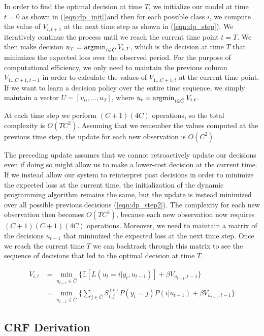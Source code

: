 \documentclass[12pt,solutions]{article}
\newcommand{\argmin}{\operatornamewithlimits{argmin}}
\newcommand{\E}{\mathbb{E}}
\begin{document}
In order to find the optimal decision at time $T$, we initialize our model at time $t=0$ as shown in (\ref{eqn:dp_init})and then for each possible class $i$, we compute the value of $V_{i,t+1}$ at the next time step as shown in (\ref{eqn:dp_step}). We iteratively continue the process until we reach the current time point $t=T$. We then make decision $u_T = \argmin_{i \in \hat{C}} V_{i, T}$, which is the decision at time $T$ that minimizes the expected loss over the observed period. For the purpose of computational efficiency, we only need to maintain the previous column $V_{1\ldots C+1, t-1}$ in order to calculate the values of $V_{1\ldots C+1, t}$ at the current time point. If we want to learn a decision policy over the entire time sequence, we simply maintain a vector $U = [u_0, \ldots, u_T]$, where $u_t =  \argmin_{i \in \hat{C}} V_{i, t}$.

At each time step we perform $(C+1)(4C)$ operations, so the total complexity is $O(TC^2)$. Assuming that we remember the values computed at the previous time step, the update for each new observation is $O(C^2)$.


The preceding update assumes that we cannot retroactively update our decisions even if doing so might allow us to make a lower-cost decision at the current time. If we instead allow our system to reinterpret past decisions in order to minimize the expected loss at the current time, the initialization of the dynamic programming algorithm remains the same, but the update is instead minimized over all possible previous decisions (\ref{eqn:dp_step2}). The complexity for each new observation then becomes $O(TC^3)$, because each new observation now requires $(C+1)(C+1)(4C)$ operations. Moreover, we need to maintain a matrix of the decisions $u_{t-1}$ that minimized the expected loss at the next time step. Once we reach the current time $T$ we can backtrack through this matrix to see the sequence of decisions that led to the optimal decision at time $T$. 

\begin{align}
V_{i,t} &= \min_{u_{t-1} \in \hat{C}} \big\{ \E[L(u_t=i|y_t, u_{t-1})] + \beta V_{u_{t-1},t-1}\big\}\\
&=  \min_{u_{t-1} \in \hat{C}} \big\{  \sum_{j \in \bar{C}} S_{i,j}^{(t)} P(y_t=j)P(i|u_{t-1}) + \beta V_{u_{t-1},t-1}\big\}
 \label{eqn:dp_step2}
\end{align}




\subsection{CRF Derivation}
\end{document}

